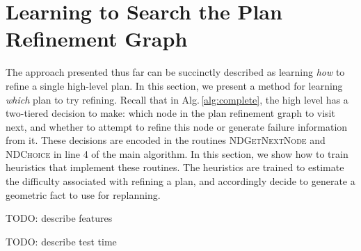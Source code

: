 \section{Learning to Search the Plan Refinement Graph}
The approach presented thus far can be succinctly described as learning \emph{how} to
refine a single high-level plan. In this section, we present a method for learning
\emph{which} plan to try refining. Recall that in Alg.\,\ref{alg:complete}, the high
level has a two-tiered decision to make: which node in the plan refinement graph to
visit next, and whether to attempt to refine this node or generate failure information
from it. These decisions are encoded in the routines \textsc{NDGetNextNode}
and \textsc{NDChoice} in line 4 of the main algorithm. In this section, we show how
to train heuristics that implement these routines. The heuristics are trained to estimate
the difficulty associated with refining a plan, and accordingly decide to generate
a geometric fact to use for replanning.

TODO: describe features

TODO: describe test time
